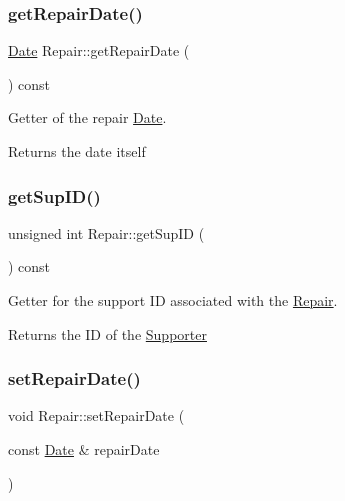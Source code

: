\subsubsection{\texorpdfstring{get\+Repair\+Date()}{getRepairDate()}}
{\footnotesize\ttfamily \mbox{\hyperlink{class_date}{Date}} Repair\+::get\+Repair\+Date (\begin{DoxyParamCaption}{ }\end{DoxyParamCaption}) const}



Getter of the repair \mbox{\hyperlink{class_date}{Date}}. 

\begin{DoxyReturn}{Returns}
the date itself 
\end{DoxyReturn}
\mbox{\label{class_repair_a0aa4bf5af38b5f4b96bfcadfa8b60318}} 
\subsubsection{\texorpdfstring{get\+Sup\+I\+D()}{getSupID()}}
{\footnotesize\ttfamily unsigned int Repair\+::get\+Sup\+ID (\begin{DoxyParamCaption}{ }\end{DoxyParamCaption}) const}



Getter for the support ID associated with the \mbox{\hyperlink{class_repair}{Repair}}. 

\begin{DoxyReturn}{Returns}
the ID of the \mbox{\hyperlink{class_supporter}{Supporter}} 
\end{DoxyReturn}
\mbox{\label{class_repair_a7c75483403ed47f71668740115a38f71}} 
\subsubsection{\texorpdfstring{set\+Repair\+Date()}{setRepairDate()}}
{\footnotesize\ttfamily void Repair\+::set\+Repair\+Date (\begin{DoxyParamCaption}\item[{const \mbox{\hyperlink{class_date}{Date}} \&}]{repair\+Date }\end{DoxyParamCaption})}



